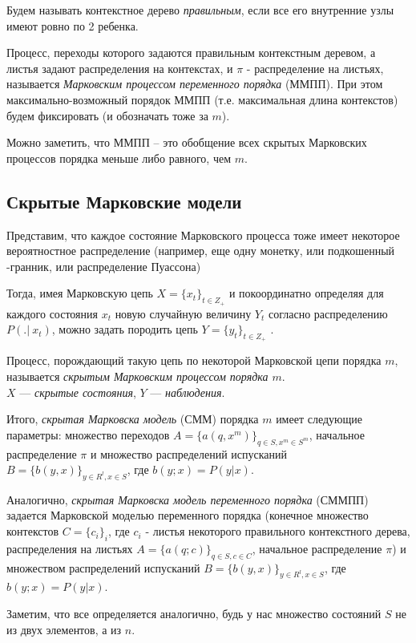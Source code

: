 \documentclass{matmex-diploma-custom}
\begin{document}
Будем называть контекстное дерево \textit{правильным}, если все его внутренние узлы имеют ровно по 2 ребенка.

Процесс, переходы которого задаются правильным контекстным деревом, а листья задают распределения на контекстах, и $\pi$ - распределение на листьях,  называется \textit{Марковским процессом переменного порядка} (ММПП).
При этом максимально-возможный порядок ММПП (т.е. максимальная длина контекстов) будем фиксировать (и обозначать тоже за $ m $).

Можно заметить, что ММПП -- это обобщение всех скрытых Марковских процессов порядка меньше либо равного, чем $ m $.

\subsection{Скрытые Марковские модели}
Представим, что каждое состояние Марковского процесса тоже имеет некоторое вероятностное распределение (например, еще одну монетку, или подкошенный \infty-гранник, или распределение Пуассона)

Тогда, имея Марковскую цепь $X = \{x_{t}\}_{t \in Z_{+}}$ и покоординатно определяя для каждого состояния $x_{t}$ новую случайную величину $Y_{t}$ согласно распределению $P(.|~x_{t})$, можно задать породить цепь
$Y = \{y_{t}\}_{t \in Z_{+}}$ .

Процесс, порождающий такую цепь по некоторой Марковской цепи порядка $m$, называется \textit{скрытым Марковским процессом порядка $m$}. 
\\
$ X $ --- \textit{скрытые состояния}, $Y$ --- \textit{наблюдения}.

Итого, \textit{скрытая Марковска модель} (СММ) порядка $ m $ имеет следующие параметры: множество переходов $ A = \{a(q, x^{m})\}_{q \in S, x^{m} \in S^{m}}$, начальное распределение $\pi$ и множество распределений испусканий $ B = \{b(y,x)\}_{y \in R^{l}, x \in S}$, где $ b(y; x) = P(y|x)$. 

Аналогично, \textit{скрытая Марковска модель переменного порядка} (СММПП) задается Марковской моделью переменного порядка (конечное множество контекстов $ C=\{c_{i}\}_{i} $, где $ c_{i} $ - листья некоторого правильного контекстного дерева, распределения на листьях $ A = \{a(q; c)\}_{q \in S, c \in C}$, начальное распределение $ \pi $)  и множеством распределений испусканий $ B = \{b(y,x)\}_{y \in R^{l}, x \in S}$, где $ b(y; x) = P(y|x)$. 

Заметим, что все определяется аналогично, будь у нас множество состояний $ S $ не из двух элементов, а из $n$.
\end{document}
